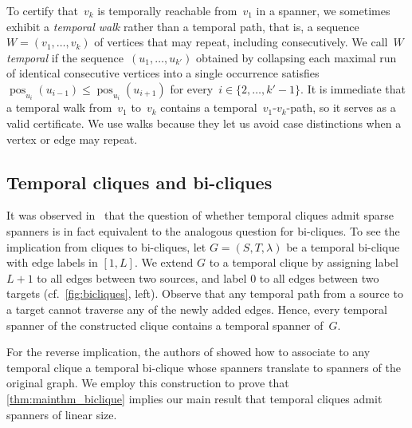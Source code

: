 \documentclass[11pt, letterpaper]{article}
\DeclareMathOperator{\pos}{pos}
\theoremstyle{definition}
\theoremstyle{plain}
\begin{document}
To certify that~$v_k$ is temporally reachable from~$v_1$ in a spanner, we sometimes exhibit a \emph{temporal walk} rather than a temporal path, that is, a sequence~$W=(v_1,\dots,v_k)$ of vertices that may repeat, including consecutively. 
We call~$W$ \emph{temporal} if the sequence~$(u_1,\dots,u_{k'})$ obtained by collapsing each maximal run of identical consecutive vertices into a single occurrence satisfies $\pos_{u_i}(u_{i-1})\leq\pos_{u_i}(u_{i+1})$ for every~$i\in\{2,\dots,k'-1\}$. 
It is immediate that a temporal walk from~$v_1$ to~$v_k$ contains a temporal~\mbox{$v_1$-$v_k$}-path, so it serves as a valid certificate. 
We use walks because they let us avoid case distinctions when a vertex or edge may repeat.


\subsection{Temporal cliques and bi-cliques}


It was observed in~\cite{Angrick24} that the question of whether temporal cliques admit sparse spanners is in fact equivalent to the analogous question for bi-cliques.
To see the implication from cliques to bi-cliques, let $G = (S, T, \lambda)$ be a temporal bi-clique with edge labels in $[1,L]$.
We extend $G$ to a temporal clique by assigning label $L+1$ to all edges between two sources, and label $0$ to all edges between two targets (cf.~\cref{fig:bicliques}, left).
Observe that any temporal path from a source to a target cannot traverse any of the newly added edges.
Hence, every temporal spanner of the constructed clique contains a temporal spanner of~$G$.

For the reverse implication, the authors of \cite{Angrick24} showed how to associate to any temporal clique a temporal bi-clique whose spanners translate to spanners of the original graph.
We employ this construction to prove that \cref{thm:mainthm_biclique} implies our main result that temporal cliques admit spanners of linear size.
\end{document}
